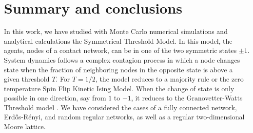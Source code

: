 	
	
	\section{\label{Summary and conclusions} Summary and conclusions}
	
	
	In this work, we have studied with Monte Carlo numerical simulations and analytical calculations the Symmetrical Threshold Model. In this model, the agents, nodes of a contact  network, can be in one of the two symmetric states $\pm 1$.  System dynamics follows a complex contagion process in which a node changes state when the fraction of neighboring nodes in the opposite state is above a given threshold $T$. For $T=1/2$, the model reduces to a majority rule or the zero temperature Spin Flip Kinetic Ising Model. When the change of state is only possible in one direction, say from $1$ to $-1$, it reduces to the Granovetter-Watts Threshold model \cite{granovetter-1978,watts-2002,Abella-2022-AME}. We have considered the cases of a fully connected network, Erd\H{o}s-Rényi, and random regular networks, as well as a regular two-dimensional Moore lattice. 
	
